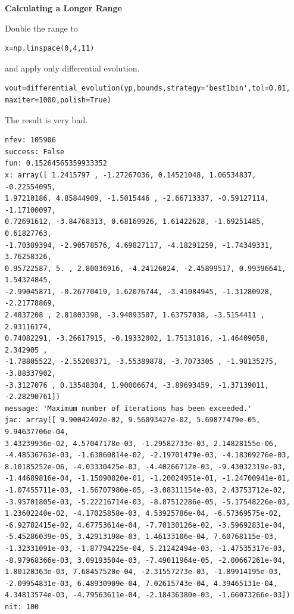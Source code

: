 \documentclass{tufte-handout}
\begin{document}
{\bf{Calculating a Longer Range}}

Double the range to

\begin{verbatim}
x=np.linspace(0,4,11)
\end{verbatim}

and apply only differential evolution.

\begin{verbatim}
vout=differential_evolution(yp,bounds,strategy='best1bin',tol=0.01, maxiter=1000,polish=True)
\end{verbatim}

The result is very bad.

\begin{verbatim}
nfev: 105906 
success: False 
fun: 0.15264565359933352 
x: array([ 1.2415797 , -1.27267036, 0.14521048, 1.06534837, -0.22554095,
1.97210186, 4.85844909, -1.5015446 , -2.66713337, -0.59127114, -1.17100097,
0.72691612, -3.84768313, 0.68169926, 1.61422628, -1.69251485, 0.61827763,
-1.70389394, -2.90578576, 4.69827117, -4.18291259, -1.74349331, 3.76258326,
0.95722587, 5. , 2.80036916, -4.24126024, -2.45899517, 0.99396641, 1.54324845,
-2.99045871, -0.26770419, 1.62076744, -3.41084945, -1.31280928, -2.21778869,
2.4837208 , 2.81803398, -3.94093507, 1.63757038, -3.5154411 , 2.93116174,
0.74082291, -3.26617915, -0.19332002, 1.75131816, -1.46409058, 2.342905 ,
-1.78805522, -2.55208371, -3.55389878, -3.7073305 , -1.98135275, -3.88337902,
-3.3127076 , 0.13548304, 1.90006674, -3.89693459, -1.37139011, -2.28290761])
message: 'Maximum number of iterations has been exceeded.' 
jac: array([ 9.90042492e-02, 9.56093427e-02, 5.69877479e-05, 9.94637706e-04,
3.43239936e-02, 4.57047178e-03, -1.29582733e-03, 2.14828155e-06,
-4.48536763e-03, -1.63860814e-02, -2.19701479e-03, -4.18309276e-03,
8.10185252e-06, -4.03330425e-03, -4.40266712e-03, -9.43032319e-03,
-1.44689816e-04, -1.15090820e-01, -1.20024951e-01, -1.24700941e-01,
-1.07455711e-03, -1.56707980e-05, -3.08311154e-03, 2.43753712e-02,
-3.95701805e-03, -5.22216714e-03, -8.87512286e-05, -5.17548226e-03,
1.23602240e-02, -4.17025858e-03, 4.53925786e-04, -6.57369575e-02,
-6.92782415e-02, 4.67753614e-04, -7.70130126e-02, -3.59692831e-04,
-5.45286039e-05, 3.42913198e-03, 1.46133106e-04, 7.60768115e-03,
-1.32331091e-03, -1.87794225e-04, 5.21242494e-03, -1.47535317e-03,
-8.97968366e-03, 3.09193504e-03, -7.49011964e-05, -2.00667261e-04,
1.80120363e-03, 7.68457520e-04, -2.31557273e-03, -1.89914195e-03,
-2.09954831e-03, 6.48930909e-04, 7.02615743e-04, 4.39465131e-04,
4.34813574e-03, -4.79563611e-04, -2.18436380e-03, -1.66073266e-03]) 
nit: 100
\end{verbatim}
\end{document}
